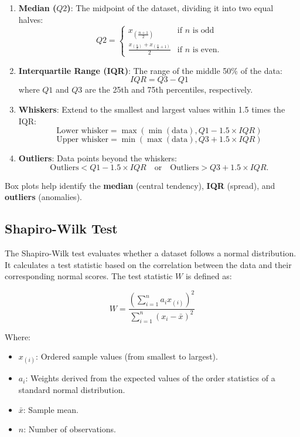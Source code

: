 \documentclass[a4paper, 12pt]{article}
\begin{document}
\begin{enumerate}
    \item \textbf{Median (\(Q2\))}: 
    The midpoint of the dataset, dividing it into two equal halves:
    \[
    Q2 = 
    \begin{cases} 
    x_{\left(\frac{n+1}{2}\right)} & \text{if } n \text{ is odd} \\
    \frac{x_{\left(\frac{n}{2}\right)} + x_{\left(\frac{n}{2}+1\right)}}{2} & \text{if } n \text{ is even}.
    \end{cases}
    \]
    \item \textbf{Interquartile Range (IQR)}:
    The range of the middle 50\% of the data:
    \[
    IQR = Q3 - Q1
    \]
    where \(Q1\) and \(Q3\) are the 25th and 75th percentiles, respectively.

    \item \textbf{Whiskers}:
    Extend to the smallest and largest values within 1.5 times the IQR:
    \[
    \text{Lower whisker} = \max(\min(\text{data}), Q1 - 1.5 \times IQR)
    \]
    \[
    \text{Upper whisker} = \min(\max(\text{data}), Q3 + 1.5 \times IQR)
    \]

    \item \textbf{Outliers}:
    Data points beyond the whiskers:
    \[
    \text{Outliers} < Q1 - 1.5 \times IQR \quad \text{or} \quad \text{Outliers} > Q3 + 1.5 \times IQR.
    \]
\end{enumerate}

Box plots help identify the \textbf{median} (central tendency), \textbf{IQR} (spread), and \textbf{outliers} (anomalies).


\subsection{Shapiro-Wilk Test} \label{appendix:shapiro}
The Shapiro-Wilk test evaluates whether a dataset follows a normal distribution. It calculates a test statistic based on the correlation between the data and their corresponding normal scores. The test statistic \(W\) is defined as:

\[
W = \frac{\left( \sum_{i=1}^{n} a_i x_{(i)} \right)^2}{\sum_{i=1}^{n} (x_i - \bar{x})^2}
\]

Where:
\begin{itemize}
    \item \(x_{(i)}\): Ordered sample values (from smallest to largest).
    \item \(a_i\): Weights derived from the expected values of the order statistics of a standard normal distribution.
    \item \(\bar{x}\): Sample mean.
    \item \(n\): Number of observations.
\end{itemize}
\end{document}
